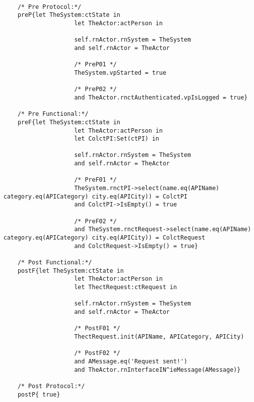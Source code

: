 	\scriptsize
	\vspace{0.5cm}
	\begin{lstlisting}[style=MessirStyle,firstnumber=auto,captionpos=b,caption={\msrmessir (MCL-oriented) specification of the operation \emph{oeSendNewRequest}.},label=OM-actPerson-oeSendNewRequest-MCL-LST]

	/* Pre Protocol:*/ 
	preP{let TheSystem:ctState in
					let TheActor:actPerson in
					
					self.rnActor.rnSystem = TheSystem
					and self.rnActor = TheActor
					
					/* PreP01 */
					TheSystem.vpStarted = true
					
					/* PreP02 */
					and TheActor.rnctAuthenticated.vpIsLogged = true}
	
	/* Pre Functional:*/
	preF{let TheSystem:ctState in
					let TheActor:actPerson in
					let ColctPI:Set(ctPI) in
					
					self.rnActor.rnSystem = TheSystem
					and self.rnActor = TheActor
					
					/* PreF01 */
					TheSystem.rnctPI->select(name.eq(APIName) category.eq(APICategory) city.eq(APICity)) = ColctPI
					and ColctPI->IsEmpty() = true
					
					/* PreF02 */
					and TheSystem.rnctRequest->select(name.eq(APIName) category.eq(APICategory) city.eq(APICity)) = ColctRequest
					and ColctRequest->IsEmpty() = true}
	
	/* Post Functional:*/ 
	postF{let TheSystem:ctState in
					let TheActor:actPerson in
					let ThectRequest:ctRequest in
					
					self.rnActor.rnSystem = TheSystem
					and self.rnActor = TheActor
					
					/* PostF01 */
					ThectRequest.init(APIName, APICategory, APICity)
					
					/* PostF02 */
					and AMessage.eq('Request sent!')
					and TheActor.rnInterfaceIN^ieMessage(AMessage)}
	
	/* Post Protocol:*/ 
	postP{ true}
	
	\end{lstlisting}
	\normalsize 
	
	
	
	





